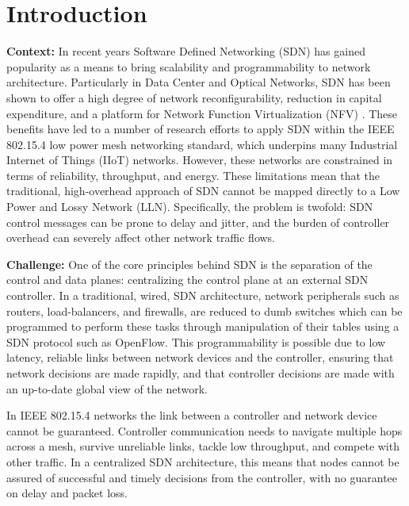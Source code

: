 \section{Introduction}

\label{sec_intro}
\textbf{Context:} In recent years Software Defined Networking (SDN) has gained popularity as a means to bring scalability and programmability to network architecture. Particularly in Data Center and Optical Networks, SDN has been shown to offer a high degree of network reconfigurability, reduction in capital expenditure, and a platform for Network Function Virtualization (NFV) \cite{sdn_comprehensive_survey}. These benefits have led to a number of research efforts to apply SDN within the IEEE 802.15.4 low power mesh networking standard, which underpins many Industrial Internet of Things (IIoT) networks. However, these networks are constrained in terms of reliability, throughput, and energy. These limitations mean that the traditional, high-overhead approach of SDN cannot be mapped directly to a Low Power and Lossy Network (LLN). Specifically, the problem is twofold: SDN control messages can be prone to delay and jitter, and the burden of controller overhead can severely affect other network traffic flows.

\textbf{Challenge:} One of the core principles behind SDN is the separation of the control and data planes: centralizing the control plane at an external SDN controller. In a traditional, wired, SDN architecture, network peripherals such as routers, load-balancers, and firewalls, are reduced to dumb switches which can be programmed to perform these tasks through manipulation of their tables using a SDN protocol such as OpenFlow. This programmability is possible due to low latency, reliable links between network devices and the controller, ensuring that network decisions are made rapidly, and that controller decisions are made with an up-to-date global view of the network. 

In IEEE 802.15.4 networks the link between a controller and network device cannot be guaranteed. Controller communication needs to navigate multiple hops across a mesh, survive unreliable links, tackle low throughput, and compete with other traffic. In a centralized SDN architecture, this means that nodes cannot be assured of successful and timely decisions from the controller, with no guarantee on delay and packet loss. 

